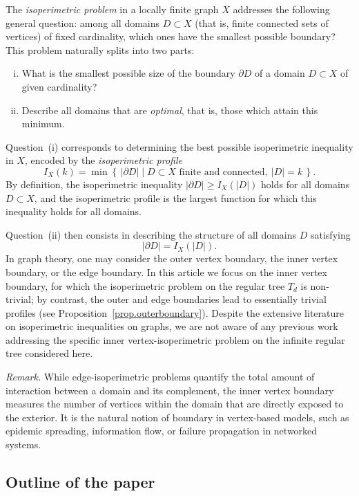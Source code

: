 \documentclass[a4paper, 11pt]{article}
\numberwithin{equation}{section}
\theoremstyle{definition}
\theoremstyle{remark}
\begin{document}
The \emph{isoperimetric problem} in a locally finite graph $X$ addresses the following general question: among all domains $D \subset X$ (that is, finite
connected sets of vertices) of fixed cardinality, which ones have the smallest possible boundary? This problem naturally splits into two parts:
\begin{enumerate}[(i)]
  \item What is the smallest possible size of the boundary $\partial D$ of a
        domain $D \subset X$ of given cardinality?
  \item Describe all domains that are \emph{optimal}, that is, those which attain this minimum.
\end{enumerate}

Question~(i) corresponds to determining the best possible isoperimetric inequality in $X$, encoded by the \emph{isoperimetric profile}
$$
   I_X(k) = \min \left\{\, |\partial D| \mid D \subset X \text{ finite and connected},\ |D| = k \,\right\}.
$$
By definition, the isoperimetric inequality
$
    |\partial D| \geq I_X(|D|)
$
holds for all domains $D \subset X$, and the  isoperimetric profile is the largest function for which this inequality holds for all domains.

\smallskip 

Question~(ii) then consists in describing the structure of all domains $D$
satisfying
\[
   |\partial D| = I_X(|D|).
\]
In graph theory, one may consider the outer vertex boundary, the inner vertex boundary, or the edge boundary. In this article we focus on the inner vertex
boundary, for which the isoperimetric problem on the regular tree $T_d$ is non-trivial; by contrast, the outer and edge boundaries lead to essentially
trivial profiles (see Proposition~\ref{prop.outerboundary}).
Despite the extensive literature on isoperimetric inequalities on graphs, we are not aware of any previous work addressing the specific  inner vertex-isoperimetric problem on the infinite regular tree considered here.

\medskip

\textit{Remark.}  While edge-isoperimetric problems quantify the total amount of interaction
between a domain and its complement, the inner vertex boundary measures the
number of vertices within  the domain that are directly exposed to the exterior.
It is  the natural notion of boundary in vertex-based models, such as
epidemic spreading, information flow, or failure propagation in networked
systems.

\subsection{Outline of the paper}
\end{document}
